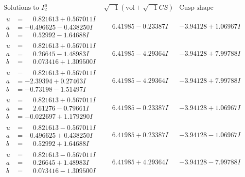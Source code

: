 \documentclass[1p]{elsarticle_modified}
\theoremstyle{definition}
\newcommand{\I}{\sqrt{-1}}
\begin{document}
$$\begin{array}{c|c|c}  
\text{Solutions to }I^u_{2}& \I (\text{vol} + \sqrt{-1}CS) & \text{Cusp shape}\\
 \hline 
\begin{aligned}
u &= \phantom{-}0.821613 + 0.567011 I \\
a &= -0.496625 - 0.438250 I \\
b &= \phantom{-}0.52992 - 1.64688 I\end{aligned}
 & \phantom{-}6.41985 - 0.23387 I & -3.94128 + 1.06967 I \\ \hline\begin{aligned}
u &= \phantom{-}0.821613 + 0.567011 I \\
a &= \phantom{-}0.26645 - 1.48983 I \\
b &= \phantom{-}0.073416 + 1.309500 I\end{aligned}
 & \phantom{-}6.41985 - 4.29364 I & -3.94128 + 7.99788 I \\ \hline\begin{aligned}
u &= \phantom{-}0.821613 + 0.567011 I \\
a &= -2.39394 + 0.27463 I \\
b &= -0.73198 - 1.51497 I\end{aligned}
 & \phantom{-}6.41985 - 4.29364 I & -3.94128 + 7.99788 I \\ \hline\begin{aligned}
u &= \phantom{-}0.821613 + 0.567011 I \\
a &= \phantom{-}2.61276 - 0.79661 I \\
b &= -0.022697 + 1.179290 I\end{aligned}
 & \phantom{-}6.41985 - 0.23387 I & -3.94128 + 1.06967 I \\ \hline\begin{aligned}
u &= \phantom{-}0.821613 - 0.567011 I \\
a &= -0.496625 + 0.438250 I \\
b &= \phantom{-}0.52992 + 1.64688 I\end{aligned}
 & \phantom{-}6.41985 + 0.23387 I & -3.94128 - 1.06967 I \\ \hline\begin{aligned}
u &= \phantom{-}0.821613 - 0.567011 I \\
a &= \phantom{-}0.26645 + 1.48983 I \\
b &= \phantom{-}0.073416 - 1.309500 I\end{aligned}
 & \phantom{-}6.41985 + 4.29364 I & -3.94128 - 7.99788 I \\ \hline\begin{aligned}

\end{aligned}
\end{array}$$
\end{document}

